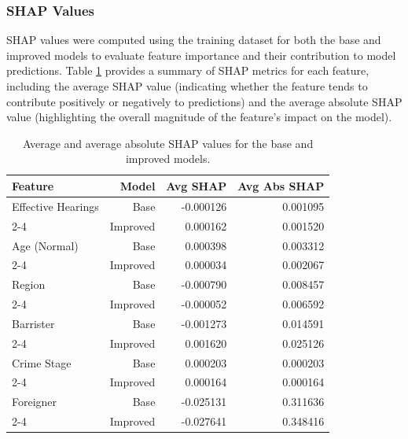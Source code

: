 \documentclass[fleqn,10pt]{wlscirep}
\begin{document}
\subsubsection{SHAP Values}

SHAP values were computed using the training dataset for both the base and improved models to evaluate feature importance and their contribution to model predictions. Table \ref{tab:dt_shap_stats_base_improved} provides a summary of SHAP metrics for each feature, including the average SHAP value (indicating whether the feature tends to contribute positively or negatively to predictions) and the average absolute SHAP value (highlighting the overall magnitude of the feature's impact on the model).

\begin{table}[h!]
\centering
\begin{tabular}{|l|r|r|r|}
\hline
\textbf{Feature} & \textbf{Model} & \textbf{Avg SHAP} & \textbf{Avg Abs SHAP} \\ \hline
Effective Hearings & Base      & -0.000126 &  0.001095  \\ \cline{2-4}
                   & Improved  &  0.000162 &   0.001520  \\ \hline
Age (Normal)         & Base      &  0.000398 &  0.003312  \\ \cline{2-4}
                   & Improved  &  0.000034 &  0.002067  \\ \hline
Region             & Base      &  -0.000790 &  0.008457  \\ \cline{2-4}
                   & Improved  &  -0.000052 &  0.006592  \\ \hline
Barrister          & Base      & -0.001273 &  0.014591  \\ \cline{2-4}
                   & Improved  &  0.001620 &  0.025126  \\ \hline
Crime Stage        & Base      &  0.000203 &  0.000203 \\ \cline{2-4}
                   & Improved  &  0.000164 &  0.000164  \\ \hline
Foreigner          & Base      & -0.025131 &  0.311636  \\ \cline{2-4}
                   & Improved  &  -0.027641 &  0.348416  \\ \hline
\end{tabular}
\caption{Average and average absolute SHAP values for the base and improved models.}
\label{tab:dt_shap_stats_base_improved}
\end{table}
\end{document}
